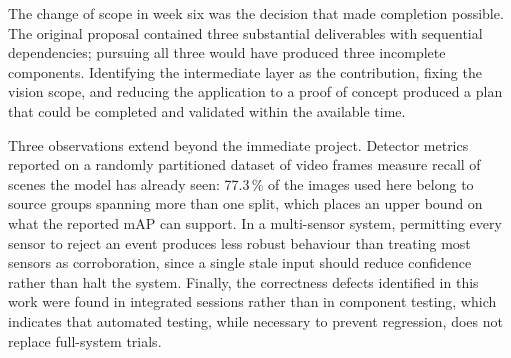 \documentclass[11pt,a4paper]{article}
\begin{document}
The change of scope in week six was the decision that made completion possible.
The original proposal contained three substantial deliverables with sequential
dependencies; pursuing all three would have produced three incomplete components.
Identifying the intermediate layer as the contribution, fixing the vision scope,
and reducing the application to a proof of concept produced a plan that could be
completed and validated within the available time.

Three observations extend beyond the immediate project. Detector metrics reported
on a randomly partitioned dataset of video frames measure recall of scenes the
model has already seen: 77.3\,\% of the images used here belong to source groups
spanning more than one split, which places an upper bound on what the reported
mAP can support. In a multi-sensor system, permitting every sensor to reject an
event produces less robust behaviour than treating most sensors as corroboration,
since a single stale input should reduce confidence rather than halt the system.
Finally, the correctness defects identified in this work were found in integrated
sessions rather than in component testing, which indicates that automated testing,
while necessary to prevent regression, does not replace full-system trials.
\end{document}
